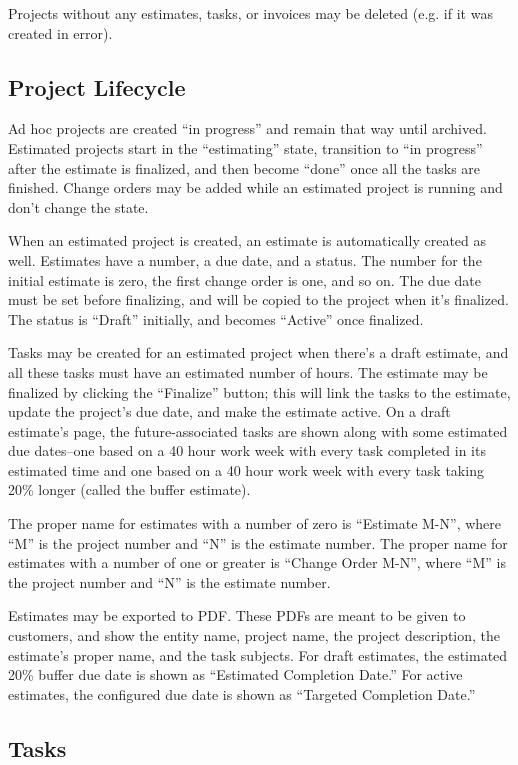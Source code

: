 \documentclass{book}
\begin{document}
Projects without any estimates, tasks, or invoices may be deleted (e.g. if it
was created in error).


\subsection{Project Lifecycle}

Ad hoc projects are created ``in progress'' and remain that way until archived.
Estimated projects start in the ``estimating'' state, transition to ``in
progress'' after the estimate is finalized, and then become ``done'' once all
the tasks are finished.
Change orders may be added while an estimated project is running and don't
change the state.

When an estimated project is created, an estimate is automatically created as
well.
Estimates have a number, a due date, and a status.
The number for the initial estimate is zero, the first change order is one, and
so on.
The due date must be set before finalizing, and will be copied to the project
when it's finalized.
The status is ``Draft'' initially, and becomes ``Active'' once finalized.

Tasks may be created for an estimated project when there's a draft estimate,
and all these tasks must have an estimated number of hours.
The estimate may be finalized by clicking the ``Finalize'' button; this will
link the tasks to the estimate, update the project's due date, and make the
estimate active.
On a draft estimate's page, the future-associated tasks are shown along with
some estimated due dates--one based on a 40 hour work week with every task
completed in its estimated time and one based on a 40 hour work week with every
task taking 20\% longer (called the buffer estimate).

The proper name for estimates with a number of zero is ``Estimate M-N'', where
``M'' is the project number and ``N'' is the estimate number.
The proper name for estimates with a number of one or greater is ``Change Order
M-N'', where ``M'' is the project number and ``N'' is the estimate number.

Estimates may be exported to PDF.
These PDFs are meant to be given to customers, and show the entity name,
project name, the project description, the estimate's proper name, and the task
subjects.
For draft estimates, the estimated 20\% buffer due date is shown as ``Estimated
Completion Date.''
For active estimates, the configured due date is shown as ``Targeted Completion
Date.''

\subsection{Tasks}

\end{document}
